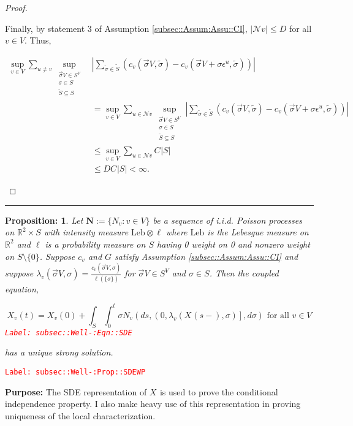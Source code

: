 \documentclass[12pt]{article}
\newcommand{\mb}{\mathbb}
\newcommand{\mc}{\mathcal}
\newcommand{\te}{\text}
\newcommand{\ep}{\epsilon}
\newcommand{\tr}{\textcolor{red}}
\newcommand{\labe}[1]{\tr{\texttt{Label: #1}}}
\newcommand{\purpose}{\textbf{Purpose: }}
\newcommand{\lin}{\rule{\linewidth}{0.4 pt}}
\newcommand{\defeq}{:=}								%
\newcommand{\neigh}{\mc{N}}					%
\renewcommand{\v}{v}							%
\newcommand{\vv}{u}								%
\renewcommand{\S}{S}							%
\newcommand{\s}{\sigma}							%
\newcommand{\sv}{\vec{\s}}						%
\newcommand{\ev}[1]{\ep^{#1}}					%
\renewcommand{\t}{t}							%
\renewcommand{\tt}{s}							%
\renewcommand{\ss}[1]{^{#1}}					%
\newcommand{\degr}{D}								%
\newcommand{\poiss}[1]{N_{#1}}						%
\newcommand{\poisses}{\mathbf{N}}				%
\newcommand{\leb}{\te{Leb}}							%
\renewcommand{\SS}{\tilde{\S}}						%
\renewcommand{\ss}{\tilde{\s}}					%
\renewcommand{\G}{G}								%
\newcommand{\V}{V}									%
\newcommand{\XState}[1]{\S^{#1}}				%
\newcommand{\rxvt}[2]{X_{#1}{(#2)}}					%
\newcommand{\rxvts}[2]{X_{#1}{#2}}					%
\newcommand{\IGr}[1]{c_{#1}}						%
\newcommand{\rate}[1]{\lambda_{#1}}					%
\newcommand{\const}[1]{C_{#1}}						%
\newcommand{\Sm}{\ell}								%
\newtheorem{prop}[thms]{Proposition: }
\begin{document}
\begin{proof}
\begin{enumerate}[i)]
Finally, by statement 3 of Assumption \ref{subsec::Assum:Assu::CI}, \(|\neigh{\v}| \leq \degr\) for all \(\v \in \V\). Thus,

\begin{align*}
\sup_{\v\in \V}\sum_{\vv \neq \v} \sup_{\substack{\sv{}{\V} \in \S^\V\\ \s\in \S\\ \SS\subseteq \S}}& \left|\sum_{\ss \in \SS} (\IGr{\v}(\sv{}{\V},\ss) - \IGr{\v}(\sv{}{\V}+\s\ev{\vv},\ss))\right|\\
&  = \sup_{\v\in \V}\sum_{\vv\in \neigh{\v}} \sup_{\substack{\sv{}{\V} \in \S^\V\\ \s\in \S\\ \SS\subseteq \S}} \left|\sum_{\ss \in \SS} (\IGr{\v}(\sv{}{\V},\ss) - \IGr{\v}(\sv{}{\V}+\s\ev{\vv},\ss))\right|\\
&\leq \sup_{\v\in \V} \sum_{\vv \in \neigh{\v}} \const{}|\S|\\
&\leq \degr \const{}|\S| < \infty.
\end{align*}


\end{enumerate}
\end{proof}

\lin

\begin{prop}
Let \(\poisses \defeq \{\poiss{\v}:\v\in \V\}\) be a sequence of i.i.d. Poisson processes on \(\mb{R}^2\times \S\) with intensity measure \(\leb\otimes \Sm\) where \(\leb\) is the Lebesgue measure on \(\mb{R}^2\) and \(\Sm\) is a probability measure on \(\S\) having 0 weight on 0 and nonzero weight on \(\S\setminus \{0\}\). Suppose \(\IGr{\v}\) and \(\G\) satisfy Assumption \ref{subsec::Assum:Assu::CI} and suppose \(\rate{\v}(\sv{}{\V},\s) = \frac{\IGr{\v}(\sv{}{\V},\s)}{\Sm(\{\s\})}\) for \(\sv{}{\V} \in \S^\V\) and \(\s \in \S\). Then the coupled equation,

\begin{equation}
\rxvt{\v}{\t} = \rxvt{\v}{0} + \int_\S\int_0^\t \s\poiss{\v}\left(d\tt,\left(0,\rate{\v}(\rxvt{}{\tt-},\s)\right],d\s\right) \te{ for all }\v \in \V
\label{subsec::Well-:Eqn::SDE}
\end{equation}
\labe{subsec::Well-:Eqn::SDE}

has a unique strong solution.
\label{subsec::Well-:Prop::SDEWP}
\end{prop}
\labe{subsec::Well-:Prop::SDEWP}

\purpose The SDE representation of \(\rxvts{}{}\) is used to prove the conditional independence property. I also make heavy use of this representation in proving uniqueness of the local characterization.
\end{document}
